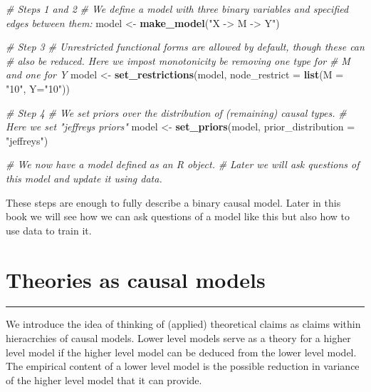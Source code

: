\documentclass[12pt,]{book}
\newenvironment{Shaded}{\begin{snugshade}}{\end{snugshade}}
\newcommand{\CommentTok}[1]{\textcolor[rgb]{0.56,0.35,0.01}{\textit{#1}}}
\newcommand{\DataTypeTok}[1]{\textcolor[rgb]{0.13,0.29,0.53}{#1}}
\newcommand{\KeywordTok}[1]{\textcolor[rgb]{0.13,0.29,0.53}{\textbf{#1}}}
\newcommand{\NormalTok}[1]{#1}
\newcommand{\StringTok}[1]{\textcolor[rgb]{0.31,0.60,0.02}{#1}}
\begin{document}
\begin{Shaded}
\begin{Highlighting}[]
\CommentTok{# Steps 1 and 2 }
\CommentTok{# We define a model with three binary variables and specified edges between them:}
\NormalTok{model <-}\StringTok{ }\KeywordTok{make_model}\NormalTok{(}\StringTok{"X -> M -> Y"}\NormalTok{)}

\CommentTok{# Step 3}
\CommentTok{# Unrestricted functional forms are allowed by default, though these can }
\CommentTok{# also be reduced. Here we impost monotonicity be removing one type for }
\CommentTok{# M and one for Y}
\NormalTok{model <-}\StringTok{ }\KeywordTok{set_restrictions}\NormalTok{(model, }
                          \DataTypeTok{node_restrict =} \KeywordTok{list}\NormalTok{(}\DataTypeTok{M =} \StringTok{"10"}\NormalTok{, }\DataTypeTok{Y=}\StringTok{"10"}\NormalTok{))}

\CommentTok{# Step 4}
\CommentTok{# We set priors over the distribution of (remaining) causal types.}
\CommentTok{# Here we set "jeffreys priors"}
\NormalTok{model <-}\StringTok{ }\KeywordTok{set_priors}\NormalTok{(model, }\DataTypeTok{prior_distribution =} \StringTok{"jeffreys"}\NormalTok{)}

\CommentTok{# We now have a model defined as an R object. }
\CommentTok{# Later we will ask questions of this model and update it using data.}
\end{Highlighting}
\end{Shaded}

These steps are enough to fully describe a binary causal model. Later in this book we will see how we can ask questions of a model like this but also how to use data to train it.

\hypertarget{theory}{%
\chapter{Theories as causal models}\label{theory}}

\begin{center}\rule{0.5\linewidth}{\linethickness}\end{center}

We introduce the idea of thinking of (applied) theoretical claims as claims within hieracrchies of causal models. Lower level models serve as a theory for a higher level model if the higher level model can be deduced from the lower level model. The empirical content of a lower level model is the possible reduction in variance of the higher level model that it can provide.
\end{document}
